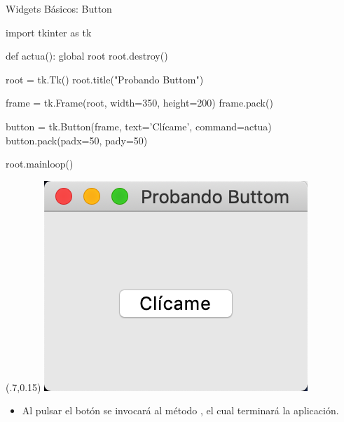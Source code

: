 \documentclass[10pt, envcountsect , spanish]{beamer}
\begin{document}
\begin{frame}[fragile]{Widgets Básicos: Button}
{}

\begin{pyverbatim}[][frame=single]
import tkinter as tk

def actua():
    global root
    root.destroy()

root = tk.Tk()
root.title("Probando Buttom")

frame = tk.Frame(root, width=350, height=200)
frame.pack()

button = tk.Button(frame, text='Clícame', command=actua)
button.pack(padx=50, pady=50)

root.mainloop()
\end{pyverbatim}

\begin{textblock*}{.25\textwidth}(.7\textwidth,0.15\textheight)
\includegraphics[width=\textwidth]{fig/buttom}
\end{textblock*}

\begin{itemize}
\item Al pulsar el botón se invocará al método , el cual terminará la aplicación.
\end{itemize}

\end{frame}
\end{document}
